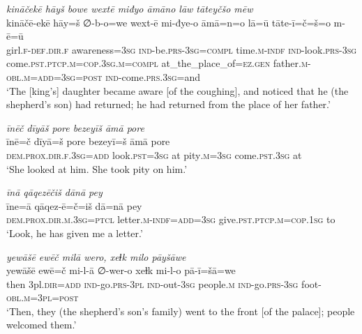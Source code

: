 \ea \label{KŠ.65}
\textit{kināčekē hāyš bowe wextē miđyo āmāno lāw tāteyčšo mēw} \\ 
\gll kināčē-ekē hāy=š ∅-b-o=we wext-ē mi-đye-o āmā=n=o lā=ū tāte-ī=č=š=o m-ē=ū \\ 
 girl\textsc{.f}\textsc{-def}\textsc{.dir}\textsc{.f} awareness\textsc{=3sg} \textsc{ind-}be\textsc{.prs}\textsc{-3sg}\textsc{=compl} time\textsc{.m}\textsc{-indf} \textsc{ind-}look\textsc{.prs}\textsc{-3sg} come\textsc{.pst}\textsc{.ptcp}\textsc{.m}\textsc{=cop}\textsc{.3sg}\textsc{.m}\textsc{=compl} at\_the\_place\_of\textsc{\textsc{=ez.gen}} father\textsc{.m}\textsc{-obl}\textsc{.m}\textsc{=add}\textsc{=3sg}\textsc{=\textsc{post}} \textsc{ind-}come\textsc{.prs}\textsc{.3sg}=and \\ 
\glt `The [king’s] daughter became aware [of the coughing], and noticed that he (the shepherd’s son) had returned; he had returned from the place of her father.'
\z 
 
\ea \label{KŠ.73}
\textit{īnēč dīyāš pore bezeyīš āmā pore} \\ 
\gll īnē=č dīyā=š pore bezeyī=š āmā pore \\ 
 \textsc{dem.prox}\textsc{.dir}\textsc{.f}\textsc{.3sg}\textsc{=add} look\textsc{.pst}\textsc{=3sg} at pity\textsc{.m}\textsc{=3sg} come\textsc{.pst}\textsc{.3sg} at \\ 
\glt `She looked at him. She took pity on him.'
\z 
 
\ea \label{KŠ.84}
\textit{īnā qāqezēčiš dānā pey} \\ 
\gll īne=ā qāqez-ē=č=iš dā=nā pey \\ 
 \textsc{dem.prox}\textsc{.dir}\textsc{.m}\textsc{.3sg}=\textsc{ptcl} letter\textsc{.m}\textsc{-indf}\textsc{=add}\textsc{=3sg} give\textsc{.pst}\textsc{.ptcp}\textsc{.m}\textsc{=cop}\textsc{.\textsc{1sg}} to \\ 
\glt `Look, he has given me a letter.'
\z 
 
\ea \label{KŠ.94}
\textit{yewāšē ewēč milā wero, xeɫk milo pāyšāwe} \\ 
\gll yewāšē ewē=č mi-l-ā ∅-wer-o xeɫk mi-l-o pā-ī=šā=we \\ 
 then 3pl\textsc{.dir}\textsc{=add} \textsc{ind-}go\textsc{.prs}\textsc{-3pl} \textsc{ind-}out\textsc{-3sg} people\textsc{.m} \textsc{ind-}go\textsc{.prs}\textsc{-3sg} foot\textsc{-obl}\textsc{.m}\textsc{=3pl}\textsc{=\textsc{post}} \\ 
\glt `Then, they (the shepherd’s son’s family) went to the front [of the palace]; people welcomed them.'
\z 
 
